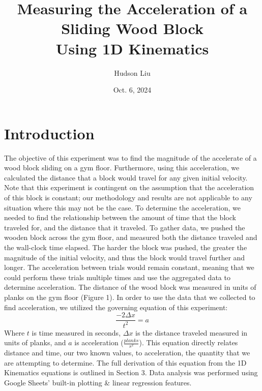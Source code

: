 \documentclass{article}
\title{Measuring the Acceleration of a Sliding Wood Block \protect\\ Using 1D Kinematics}
\author{Hudson Liu}
\date{Oct. 6, 2024}
\begin{document}
\maketitle
\begin{abstract}
\lipsum[1]
\end{abstract}
\section{Introduction}

The objective of this experiment was to find the magnitude of the accelerate of a wood block sliding on a gym floor. Furthermore, using this acceleration, we calculated the distance that a block would travel for any given initial velocity. Note that this experiment is contingent on the assumption that the acceleration of this block is constant; our methodology and results are not applicable to any situation where this may not be the case.
\newline\newline
To determine the acceleration, we needed to find the relationship between the amount of time that the block traveled for, and the distance that it traveled. To gather data, we pushed the wooden block across the gym floor, and measured both the distance traveled and the wall-clock time elapsed. The harder the block was pushed, the greater the magnitude of the initial velocity, and thus the block would travel further and longer. The acceleration between trials would remain constant, meaning that we could perform these trials multiple times and use the aggregated data to determine acceleration. The distance of the wood block was measured in units of planks on the gym floor (Figure 1).
\newline\newline
In order to use the data that we collected to find acceleration, we utilized the governing equation of this experiment:
\[
    \frac{-2 \Delta x}{t^2}=a
\]
Where $t$ is time measured in seconds, $\Delta x$ is the distance traveled measured in units of planks, and $a$ is acceleration ($\frac{planks}{s^2}$). This equation directly relates distance and time, our two known values, to acceleration, the quantity that we are attempting to determine. The full derivation of this equation from the 1D Kinematics equations is outlined in Section 3.
\newline\newline
Data analysis was performed using Google Sheets' built-in plotting \& linear regression features.
\end{document}
